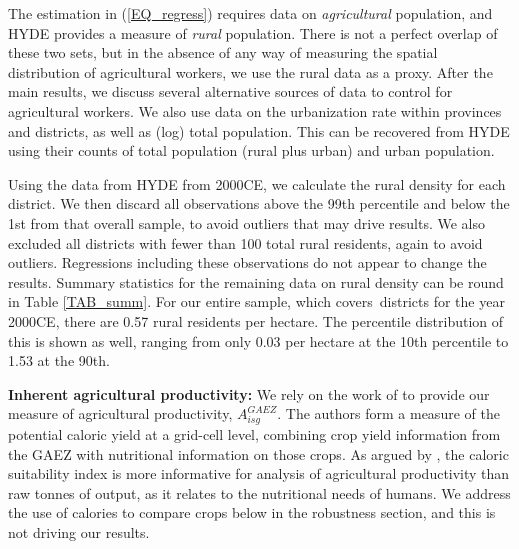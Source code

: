 \documentclass[11pt]{article}
\begin{document}
The estimation in (\ref{EQ_regress}) requires data on \textit{agricultural} population, and HYDE provides a measure of \textit{rural} population. There is not a perfect overlap of these two sets, but in the absence of any way of measuring the spatial distribution of agricultural workers, we use the rural data as a proxy. After the main results, we discuss several alternative sources of data to control for agricultural workers. We also use data on the urbanization rate within provinces and districts, as well as (log) total population. This can be recovered from HYDE using their counts of total population (rural plus urban) and urban population.

Using the data from HYDE from 2000CE, we calculate the rural density for each district. We then discard all observations above the 99th percentile and below the 1st from that overall sample, to avoid outliers that may drive results. We also excluded all districts with fewer than 100 total rural residents, again to avoid outliers. Regressions including these observations do not appear to change the results. Summary statistics for the remaining data on rural density can be round in Table \ref{TAB_summ}. For our entire sample, which covers\districts \ districts for the year 2000CE, there are 0.57 rural residents per hectare. The percentile distribution of this is shown as well, ranging from only 0.03 per hectare at the 10th percentile to 1.53 at the 90th. 

\vspace{.5cm}\noindent\textbf{Inherent agricultural productivity:} We rely on the work of \citet{galorozak2016} to provide our measure of agricultural productivity, $A^{GAEZ}_{isg}$. The authors form a measure of the potential caloric yield at a grid-cell level, combining crop yield information from the GAEZ with nutritional information on those crops. As argued by \citet{galorozak2016}, the caloric suitability index is more informative for analysis of agricultural productivity than raw tonnes of output, as it relates to the nutritional needs of humans. We address the use of calories to compare crops below in the robustness section, and this is not driving our results.
\end{document}
